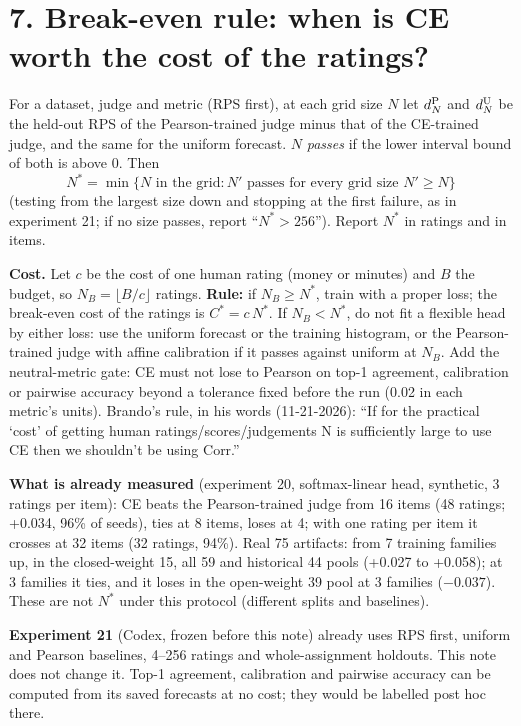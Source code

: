 \documentclass[10.5pt]{article}
\begin{document}
\section*{7. Break-even rule: when is CE worth the cost of the ratings?}
For a dataset, judge and metric (RPS first), at each grid size $N$ let $d_N^{\rm P}$ and $d_N^{\rm U}$ be the held-out RPS of the Pearson-trained judge minus that of the CE-trained judge, and the same for the uniform forecast. $N$ \emph{passes} if the lower interval bound of both is above $0$. Then
\[
N^\ast=\min\{N\text{ in the grid}: N'\text{ passes for every grid size }N'\ge N\}
\]
(testing from the largest size down and stopping at the first failure, as in experiment 21; if no size passes, report ``$N^\ast>256$''). Report $N^\ast$ in ratings and in items.

\textbf{Cost.} Let $c$ be the cost of one human rating (money or minutes) and $B$ the budget, so $N_B=\lfloor B/c\rfloor$ ratings. \textbf{Rule:} if $N_B\ge N^\ast$, train with a proper loss; the break-even cost of the ratings is $C^\ast=c\,N^\ast$. If $N_B<N^\ast$, do not fit a flexible head by either loss: use the uniform forecast or the training histogram, or the Pearson-trained judge with affine calibration if it passes against uniform at $N_B$. Add the neutral-metric gate: CE must not lose to Pearson on top-1 agreement, calibration or pairwise accuracy beyond a tolerance fixed before the run (0.02 in each metric's units). Brando's rule, in his words (11-21-2026): ``If for the practical `cost' of getting human ratings/scores/judgements N is sufficiently large to use CE then we shouldn't be using Corr.''

\textbf{What is already measured} (experiment 20, softmax-linear head, synthetic, 3 ratings per item): CE beats the Pearson-trained judge from 16 items (48 ratings; +0.034, 96\% of seeds), ties at 8 items, loses at 4; with one rating per item it crosses at 32 items (32 ratings, 94\%). Real 75 artifacts: from 7 training families up, in the closed-weight 15, all 59 and historical 44 pools (+0.027 to +0.058); at 3 families it ties, and it loses in the open-weight 39 pool at 3 families ($-0.037$). These are not $N^\ast$ under this protocol (different splits and baselines).

\textbf{Experiment 21} (Codex, frozen before this note) already uses RPS first, uniform and Pearson baselines, 4--256 ratings and whole-assignment holdouts. This note does not change it. Top-1 agreement, calibration and pairwise accuracy can be computed from its saved forecasts at no cost; they would be labelled post hoc there.
\end{document}
